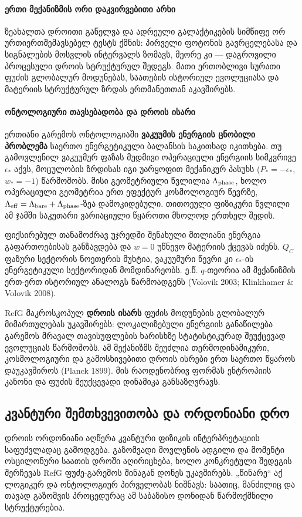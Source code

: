 \documentclass[11pt,a4paper]{article}
\begin{document}
\paragraph{ერთი მექანიზმის ორი დაკვირვებითი არხი}

ზეახალთა დროითი გაწელვა და ადრეული გალაქტიკების სიმწიფე ორ ურთიერთშემავსებელ ტესტს ქმნის: პირველი ფოტონის გავრცელებასა და სიგნალების მოსვლის ინტერვალს ზომავს, მეორე კი — დაგროვილი პროცესული დროის სტრუქტურულ შედეგს. მათი ერთობლივი სურათი ფუძის გლობალურ მოდუნებას, საათების ისტორიულ ევოლუციასა და მატერიის სტრუქტურულ ზრდას ერთმანეთთან აკავშირებს.

\paragraph{ონტოლოგიური თავსებადობა და დროის ისარი}

ერთიანი გარემოს ონტოლოგიაში \textbf{ვაკუუმის ენერგიის ცნობილი პრობლემა} საერთო ენერგეტიკული ბალანსის საკითხად იკითხება. თუ გამოვლენილ ვაკუუმურ ფაზას მუდმივი ოპერაციული ენერგიის სიმკვრივე $\epsilon_*$ აქვს, მოცულობის ზრდისას იგი უარყოფით მექანიკურ პასუხს ($P_*=-\epsilon_*$, $w_*=-1$) წარმოშობს. მისი გეომეტრიული წვლილია $\Lambda_{\rm phase}$, ხოლო ოპერაციული გეომეტრია ერთ ეფექტურ კოსმოლოგიურ წევრზე, $\Lambda_{\rm eff}=\Lambda_{\rm bare}+\Lambda_{\rm phase}$-ზეა დამოკიდებული. თითოეული ფიზიკური წვლილი ამ ჯამში საკუთარი ვარიაციული წყაროთი მხოლოდ ერთხელ შედის.

ფიქსირებულ თანამოძრავ უჯრედში შენახული მთლიანი ენერგია გაფართოებისას განზავდება და $w=0$ უწნევო მატერიის ქცევას იძენს. $Q_C$ ფაზური სექტორის ნოეთერის მუხტია, ვაკუუმური წევრი კი $\epsilon_*$-ის ენერგეტიკული სექტორიდან მომდინარეობს. ე.წ. $q$-თეორია ამ მექანიზმის ერთ-ერთ ისტორიულ ანალოგს წარმოადგენს (Volovik 2003; Klinkhamer \& Volovik 2008).

RefG მაკროსკოპულ \textbf{დროის ისარს} ფუძის მოდუნების გლობალურ მიმართულებას უკავშირებს: ლოკალიზებული ენერგიის განაწილება გარემოს მრავალ თავისუფლების ხარისხზე სტატისტიკურად შეუქცევად ევოლუციას წარმოშობს. ამ მექანიზმს შეუძლია თერმოდინამიკური, კოსმოლოგიური და გამოსხივებითი დროის ისრები ერთ საერთო წყაროს დაუკავშიროს (Planck 1899). მის რაოდენობრივ ფორმას ენტროპიის კანონი და ფუძის შეუქცევადი დინამიკა განსაზღვრავს.


\subsection{კვანტური შემთხვევითობა და ორდონიანი დრო}

დროის ორდონიანი აღწერა კვანტური ფიზიკის ინტერპრეტაციის საფუძვლადაც გამოდგება. გაზომვადი მოვლენის ადგილი და მომენტი ოსცილონური საათის დროში აღირიცხება, ხოლო კონკრეტული შედეგის შერჩევას RefG ფუძე-გარემოს შინაგან დონეს უკავშირებს. „წინარე“ აქ ლოგიკურ და ონტოლოგიურ პირველობას ნიშნავს: საათიც, მანძილიც და თავად გაზომვის პროცედურაც ამ საბაზისო დონიდან წარმოქმნილი სტრუქტურებია.
\end{document}
